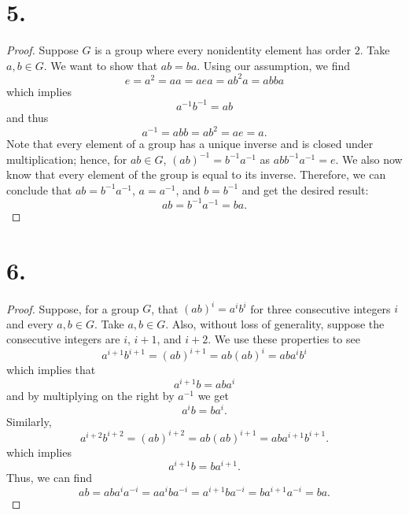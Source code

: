 \documentclass{article}
\begin{document}
\section*{5.}
\begin{proof}
Suppose $G$ is a group where every nonidentity element has order $2$. Take $a, b \in G$. We want to show that $ab = ba$. Using our assumption, we find 
\[
e = a^2 = aa = aea = ab^2a = abba     
\]
which implies 
\[
  a^{-1}b^{-1} = ab
\]
and thus 
\[
  a^{-1} = abb = ab^2 = ae = a.
\]
Note that every element of a group has a unique inverse and is closed under multiplication; hence, for $ab \in G$, $(ab)^{-1} = b^{-1}a^{-1}$ as $abb^{-1}a^{-1} = e$. We also now know that every element of the group is equal to its inverse. Therefore, we can conclude that $ab = b^{-1}a^{-1}$, $a = a^{-1}$, and $b = b^{-1}$ and get the desired result: 
\[
  ab = b^{-1}a^{-1} = ba. 
\]
\end{proof}

\section*{6.}
\begin{proof}
Suppose, for a group $G$, that $(ab)^i = a^ib^i$ for three consecutive integers $i$ and every $a, b \in G$. Take $a, b \in G$. Also, without loss of generality, suppose the consecutive integers are $i$, $i + 1$, and $i + 2$. We use these properties to see 
\[
 a^{i + 1}b^{i + 1} = (ab)^{i + 1} = ab(ab)^i = aba^ib^i 
\]
which implies that 
\[
 a^{i + 1}b = aba^i 
\]
and by multiplying on the right by $a^{-1}$ we get
\[
 a^ib = ba^i.
\]
Similarly,
\[
  a^{i + 2}b^{i + 2} = (ab)^{i + 2} = ab(ab)^{i + 1} = aba^{i + 1}b^{i + 1}.
\]
which implies 
\[
 a^{i + 1}b = ba^{i + 1}.  
\]
 Thus, we can find
\[
 ab = aba^ia^{-i} =  aa^iba^{-i} = a^{i + 1}ba^{-i} = ba^{i + 1}a^{-i} = ba. 
\]
\end{proof}
\end{document}
